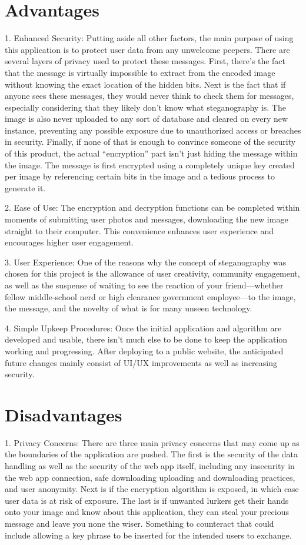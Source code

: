 \documentclass[conference]{IEEEtran}
\begin{document}
\section{Advantages}
1. Enhanced Security: Putting aside all other factors, the main purpose of using this application is to protect user data from any unwelcome peepers. There are several layers of privacy used to protect these messages. First, there’s the fact that the message is virtually impossible to extract from the encoded image without knowing the exact location of the hidden bits. Next is the fact that if anyone sees these messages, they would never think to check them for messages, especially considering that they likely don’t know what steganography is. The image is also never uploaded to any sort of database and cleared on every new instance, preventing any possible exposure due to unauthorized access or breaches in security. Finally, if none of that is enough to convince someone of the security of this product, the actual “encryption” part isn’t just hiding the message within the image. The message is first encrypted using a completely unique key created per image by referencing certain bits in the image and a tedious process to generate it.

2. Ease of Use: The encryption and decryption functions can be completed within moments of submitting user photos and messages, downloading the new image straight to their computer. This convenience enhances user experience and encourages higher user engagement.

3. User Experience: One of the reasons why the concept of steganography was chosen for this project is the allowance of user creativity, community engagement, as well as the suspense of waiting to see the reaction of your friend—whether fellow middle-school nerd or high clearance government employee—to the image, the message, and the novelty of what is for many unseen technology.

4. Simple Upkeep Procedures: Once the initial application and algorithm are developed and usable, there isn’t much else to be done to keep the application working and progressing. After deploying to a public website, the anticipated future changes mainly consist of UI/UX improvements as well as increasing security.


\section{Disadvantages}
1. Privacy Concerns: There are three main privacy concerns that may come up as the boundaries of the application are pushed. The first is the security of the data handling as well as the security of the web app itself, including any insecurity in the web app connection, safe downloading uploading and downloading practices, and user anonymity. Next is if the encryption algorithm is exposed, in which case user data is at risk of exposure. The last is if unwanted lurkers get their hands onto your image and know about this application, they can steal your precious message and leave you none the wiser. Something to counteract that could include allowing a key phrase to be inserted for the intended users to exchange.
\end{document}
